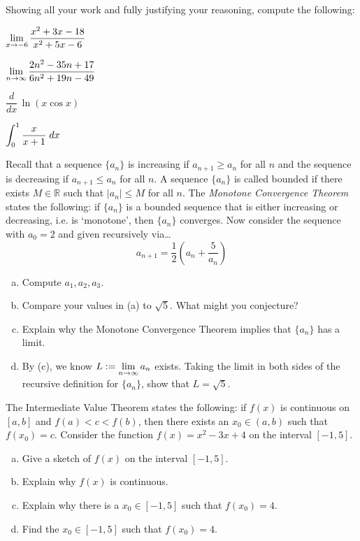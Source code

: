 \documentclass[11pt,letterpaper]{article}
\begin{document}

 Showing all your work and fully justifying your reasoning, compute the following:
	\begin{2enumerate}
	\item $\displaystyle \lim_{x \to -6} \dfrac{x^2 + 3x - 18}{x^2 + 5x - 6}$
	\item $\displaystyle \lim_{n \to \infty} \dfrac{2n^2 - 35n + 17}{6n^2 + 19n - 49}$
	\item $\dfrac{d}{dx} \, \ln \left(x \cos x \right)$
	\item $\displaystyle \int_0^1 \dfrac{x}{x + 1} \;dx$
	\end{2enumerate}



\newpage



 Recall that a sequence $\{ a_n \}$ is increasing if $a_{n+1} \geq a_n$ for all $n$ and the sequence is decreasing if $a_{n+1} \leq a_n$ for all $n$. A sequence $\{ a_n \}$ is called bounded if there exists $M \in \mathbb{R}$ such that $|a_n| \leq M$ for all $n$. The \textit{Monotone Convergence Theorem} states the following: if $\{ a_n \}$ is a bounded sequence that is either increasing or decreasing, i.e. is `monotone', then $\{ a_n \}$ converges. Now consider the sequence with $a_0= 2$ and given recursively via\dots
	\[
	a_{n+1}= \dfrac{1}{2} \left( a_n + \dfrac{5}{a_n} \right)
	\]

\begin{enumerate}[(a)]
\item Compute $a_1, a_2, a_3$. 
\item Compare your values in (a) to $\sqrt{5}$. What might you conjecture?
\item Explain why the Monotone Convergence Theorem implies that $\{ a_n \}$ has a limit. 
\item By (c), we know $L:= \displaystyle \lim_{n \to \infty} a_n$ exists. Taking the limit in both sides of the recursive definition for $\{ a_n \}$, show that $L= \sqrt{5}$. 
\end{enumerate}



\newpage



 The Intermediate Value Theorem states the following: if $f(x)$ is continuous on $[a, b]$ and $f(a) < c < f(b)$, then there exists an $x_0 \in (a, b)$ such that $f(x_0)= c$. Consider the function $f(x)= x^2 - 3x + 4$ on the interval $[-1, 5]$. 
	\begin{enumerate}[(a)]
	\item Give a sketch of $f(x)$ on the interval $[-1, 5]$. 
	\item Explain why $f(x)$ is continuous. 
	\item Explain why there is a $x_0 \in [-1, 5]$ such that $f(x_0)= 4$. 
	\item Find the $x_0 \in [-1, 5]$ such that $f(x_0)= 4$. 
	\end{enumerate}
\end{document}
